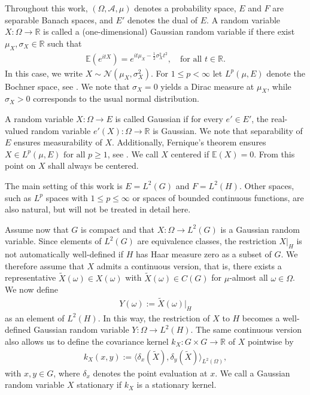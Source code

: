 \documentclass{article}
\newcommand{\R}{\mathbb{R}}
\begin{document}
Throughout this work, $(\Omega, \mathcal{A}, \mu)$ denotes a probability space, $ E $ and $F$ are separable Banach spaces, and $ E' $ denotes the dual of $E$.
A random variable $ X: \Omega \to \mathbb{R} $ is called a (one-dimensional) Gaussian random variable if there exist $ \mu_X, \sigma_X \in \mathbb{R} $ such that
\begin{align*}
\mathbb{E}\left( e^{i t X} \right) = e^{i t \mu_X - \frac{1}{2} \sigma_X^2 t^2}, \quad \text{for all } t \in \mathbb{R}.
\end{align*}
In this case, we write $ X \sim \mathcal{N}(\mu_X,\sigma_X^2) $. 
For $1 \leq p < \infty$ let $L^p(\mu,E)$ denote the Bochner space, see \cite[Chapter 1]{martingal}.
We note that $ \sigma_X = 0 $ yields a Dirac measure at $ \mu_X $, while $ \sigma_X > 0 $ corresponds to the usual normal distribution.

A random variable $ X: \Omega \to E $ is called Gaussian if for every $ e' \in E' $, the real-valued random variable $ e'(X) :\Omega \to \mathbb{R} $ is Gaussian. We note that separability of $E$ ensures measurability of $X$. Additionally, Fernique’s theorem ensures $X \in L^p(\mu,E) \, \, \text{for all } p \geq 1$, see \cite[Theorem 5.3]{Fernique53}. We call $X$ centered if $\mathbb{E}(X)=0$. From this point on $X$ shall always be centered.

The main setting of this work is $E=L^2(G)$ and $F=L^2(H)$. Other spaces, such as $L^p$ spaces with $1 \leq p \leq \infty$ or spaces of bounded continuous functions, are also natural, but will not be treated in detail here.

Assume now that $G$ is compact and that $X:\Omega \to L^2(G)$ is a Gaussian random variable. Since elements of $L^2(G)$ are equivalence classes, the restriction $X|_H$ is not automatically well-defined if $H$ has Haar measure zero as a subset of $G$. 
We therefore assume that $X$ admits a continuous version, that is, there exists a representative $\widetilde X(\omega)\in X(\omega)$ with $\widetilde X(\omega)\in C(G)$ for $\mu$-almost all $\omega\in\Omega$. We now define
\begin{align*}
    Y(\omega):=\widetilde X(\omega)|_H
\end{align*}
as an element of $L^2(H)$. In this way, the restriction of $X$ to $H$ becomes a well-defined Gaussian random variable $Y:\Omega \to L^2(H)$. The same continuous version also allows us to define the covariance kernel $k_X:G \times G \to \R$ of $X$ pointwise by
\begin{align*}
    k_X(x,y):= \langle \delta_x(\widetilde X),\delta_y(\widetilde X)\rangle_{L^2(\Omega)},
\end{align*}
with $x,y \in G$, where $\delta_x$ denotes the point evaluation at $x$. We call a Gaussian random variable $X$ stationary if $k_X$ is a stationary kernel.  
\end{document}
